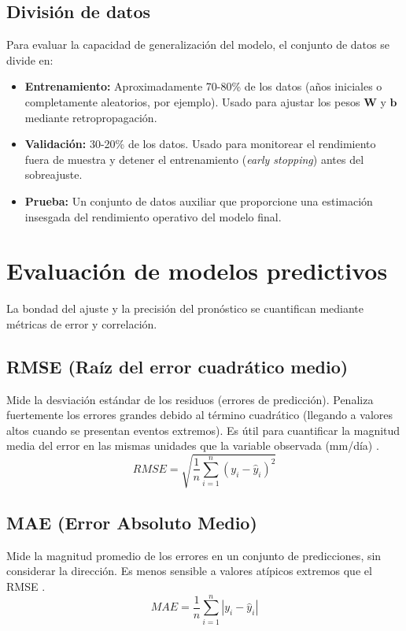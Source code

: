 \subsection{División de datos}
Para evaluar la capacidad de generalización del modelo, el conjunto de datos se divide en:
\begin{itemize}
    \item \textbf{Entrenamiento:} Aproximadamente 70-80\% de los datos (años iniciales o completamente aleatorios, por ejemplo). Usado para ajustar los pesos \(\mathbf{W}\) y \(\mathbf{b}\) mediante retropropagación.
    \item \textbf{Validación:} 30-20\% de los datos. Usado para monitorear el rendimiento fuera de muestra y detener el entrenamiento (\textit{early stopping}) antes del sobreajuste.
    \item \textbf{Prueba:} Un conjunto de datos auxiliar que proporcione una estimación insesgada del rendimiento operativo del modelo final.
\end{itemize}

\section{Evaluación de modelos predictivos}

La bondad del ajuste y la precisión del pronóstico se cuantifican mediante métricas de error y correlación.

\subsection{RMSE (Raíz del error cuadrático medio)}
Mide la desviación estándar de los residuos (errores de predicción). Penaliza fuertemente los errores grandes debido al término cuadrático (llegando a valores altos cuando se presentan eventos extremos). Es útil para cuantificar la magnitud media del error en las mismas unidades que la variable observada (mm/día) \citep{HYNDMAN2006679}.
\begin{equation}
    RMSE = \sqrt{\frac{1}{n} \sum_{i=1}^{n} (y_i - \hat{y}_i)^2}
\end{equation}

\subsection{MAE (Error Absoluto Medio)}
Mide la magnitud promedio de los errores en un conjunto de predicciones, sin considerar la dirección. Es menos sensible a valores atípicos extremos que el RMSE \citep{HYNDMAN2006679}.
\begin{equation}
    MAE = \frac{1}{n} \sum_{i=1}^{n} |y_i - \hat{y}_i|
\end{equation}

